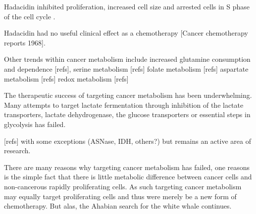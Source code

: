 Hadacidin inhibited proliferation, increased cell size and arrested cells in S phase of the cell cycle \cite{Ladino1989-rj}.

Hadacidin had no useful clinical effect as a chemotherapy [Cancer chemotherapy reports 1968].




Other trends within cancer metabolism include increased glutamine consumption and dependence [refs],
serine metabolism [refs]
folate metabolism [refs]
aspartate metabolism [refs]
redox metabolism [refs]

The therapeutic success of targeting cancer metabolism has been underwhelming.
Many attempts to target lactate fermentation through inhibition of the lactate transporters, lactate dehydrogenase, the glucose transporters or essential steps in glycolysis has failed.

[refs] with some exceptions (ASNase, IDH, others?) but remains an active area of research.

There are many reasons why targeting cancer metabolism has failed, one reasons is the simple fact that there is little metabolic difference between cancer cells and non-cancerous rapidly proliferating cells.
As such targeting cancer metabolism may equally target proliferating cells and thus were merely be a new form of chemotherapy.
But alas, the Ahabian search for the white whale continues.

















